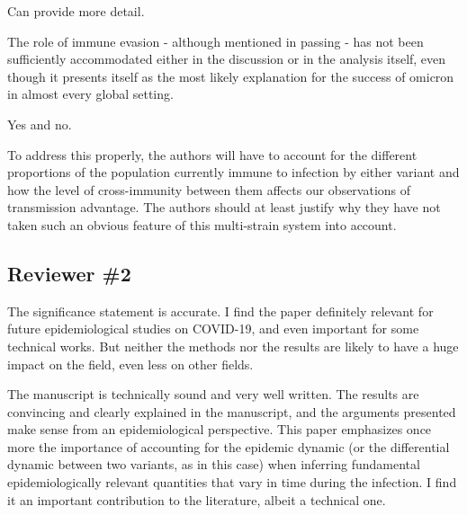 \documentclass[12pt]{article}
\newcommand{\rev}{\subsection*}
\newcommand{\revtext}{\textsf}
\begin{document}
Can provide more detail.

\revtext{The role of immune evasion - although mentioned in passing - has not been sufficiently accommodated either in the discussion or in the analysis itself, even though it presents itself as the most likely explanation for the success of omicron in almost every global setting.}

Yes and no.

\revtext{To address this properly, the authors will have to account for the different proportions of the population currently immune to infection by either variant and how the level of cross-immunity between them affects our observations of transmission advantage. The authors should at least justify why they have not taken such an obvious feature of this multi-strain system into account.}

\rev{Reviewer \#2}

\revtext{The significance statement is accurate. I find the paper definitely relevant for future epidemiological studies on COVID-19, and even important for some technical works. But neither the methods nor the results are likely to have a huge impact on the field, even less on other fields.}

\revtext{The manuscript is technically sound and very well written. The results are convincing and clearly explained in the manuscript, and the arguments presented make sense from an epidemiological perspective. This paper emphasizes once more the importance of accounting for the epidemic dynamic (or the differential dynamic between two variants, as in this case) when inferring fundamental epidemiologically relevant quantities that vary in time during the infection. I find it an important contribution to the literature, albeit a technical one.}
\end{document}
